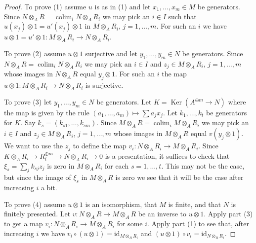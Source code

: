 \documentclass[10pt,a4paper]{amsart}
\theoremstyle{plain}
\theoremstyle{definition}
\theoremstyle{remark}
\numberwithin{equation}{subsection}
\def\colim{\mathop{\mathrm{colim}}\nolimits}
\def\Ker{\mathop{\mathrm{Ker}}}
\begin{document}
\begin{proof}
To prove (1) assume $u$ is as in (1) and
let $x_1, \ldots, x_m \in M$ be generators. Since
$N \otimes_A R = \colim_i N \otimes_A R_i$
we may pick an $i \in I$ such that $u(x_j) \otimes 1 = u'(x_j) \otimes 1$
in $M \otimes_A R_i$, $j = 1, \ldots, m$.
For such an $i$ we have
$u \otimes 1 = u' \otimes 1 : M \otimes_A R_i \to N \otimes_A R_i$.

\medskip\noindent
To prove (2) assume $u \otimes 1$ surjective and
let $y_1, \ldots, y_m \in N$ be generators. Since
$N \otimes_A R = \colim_i N \otimes_A R_i$
we may pick an $i \in I$ and $z_j \in M \otimes_A R_i$, $j = 1, \ldots, m$
whose images in $N \otimes_A R$ equal $y_j \otimes 1$.
For such an $i$ the map $u \otimes 1 : M \otimes_A R_i \to N \otimes_A R_i$
is surjective.

\medskip\noindent
To prove (3) let $y_1, \ldots, y_m \in N$ be generators. Let
$K = \Ker(A^{\oplus m} \to N)$ where the map is given by
the rule $(a_1, \ldots, a_m) \mapsto \sum a_j x_j$. Let $k_1, \ldots, k_t$
be generators for $K$. Say $k_s = (k_{s1}, \ldots, k_{sm})$.
Since $M \otimes_A R = \colim_i M \otimes_A R_i$
we may pick an $i \in I$ and $z_j \in M \otimes_A R_i$, $j = 1, \ldots, m$
whose images in $M \otimes_A R$ equal $v(y_j \otimes 1)$.
We want to use the $z_j$ to define the map
$v_i : N \otimes_A R_i \to M \otimes_A R_i$.
Since $K \otimes_A R_i \to R_i^{\oplus m} \to N \otimes_A R_i \to 0$
is a presentation, it suffices to check that $\xi_s = \sum_j k_{sj}z_j$ is
zero in $M \otimes_A R_i$ for each $s = 1, \ldots, t$. This may not
be the case, but since the image of $\xi_s$ in $M \otimes_A R$ is zero
we see that it will be the case after increasing $i$ a bit.

\medskip\noindent
To prove (4) assume $u \otimes 1$ is an isomorphism, that
$M$ is finite, and that $N$ is finitely presented.
Let $v : N \otimes_A R \to M \otimes_A R$ be an inverse to
$u \otimes 1$. Apply part (3) to get a map
$v_i : N \otimes_A R_i \to M \otimes_A R_i$ for some $i$.
Apply part (1) to see that, after increasing $i$ we have
$v_i \circ (u \otimes 1) = \text{id}_{M \otimes_R R_i}$ and
$(u \otimes 1) \circ v_i = \text{id}_{N \otimes_R R_i}$.
\end{proof}
\end{document}

